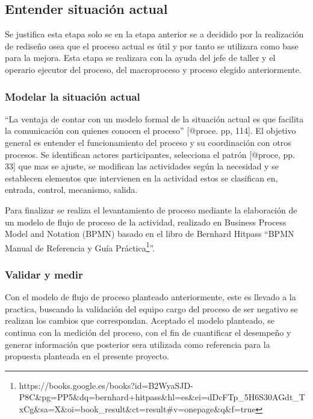 \documentclass[11pt]{article}
\begin{document}
\hypertarget{entender-situaciuxf3n-actual}{%
\subsection{Entender situación
actual}\label{entender-situaciuxf3n-actual}}

Se justifica esta etapa solo se en la etapa anterior se a decidido por
la realización de rediseño osea que el proceso actual es útil y por
tanto se utilizara como base para la mejora. Esta etapa se realizara con
la ayuda del jefe de taller y el operario ejecutor del proceso, del
macroproceso y proceso elegido anteriormente.

\hypertarget{modelar-la-situaciuxf3n-actual}{%
\subsubsection{Modelar la situación
actual}\label{modelar-la-situaciuxf3n-actual}}

``La ventaja de contar con un modelo formal de la situación actual es
que facilita la comunicación con quienes conocen el proceso'' {[}@proce.
pp, 114{]}. El objetivo general es entender el funcionamiento del
proceso y su coordinación con otros procesos. Se identifican actores
participantes, selecciona el patrón {[}@proce, pp. 33{]} que mas se
ajuste, se modifican las actividades según la necesidad y se establecen
elementos que intervienen en la actividad estos se clasifican en,
entrada, control, mecanismo, salida.

Para finalizar se realiza el levantamiento de proceso mediante la
elaboración de un modelo de flujo de proceso de la actividad, realizado
en Business Process Model and Notation (BPMN) basado en el libro de
Bernhard Hitpass ``BPMN Manual de Referencia y Guía Práctica\footnote{https://books.google.es/books?id=B2WyaSJD-P8C\&pg=PP5\&dq=bernhard+hitpass\&hl=es\&ei=dDcFTp\_5H6S30AGdt\_TxCg\&sa=X\&oi=book\_result\&ct=result\#v=onepage\&q\&f=true}''.

\hypertarget{validar-y-medir}{%
\subsubsection{Validar y medir}\label{validar-y-medir}}

Con el modelo de flujo de proceso planteado anteriormente, este es
llevado a la practica, buscando la validación del equipo cargo del
proceso de ser negativo se realizan los cambios que correspondan.
Aceptado el modelo planteado, se continua con la medición del proceso,
con el fin de cuantificar el desempeño y generar información que
posterior sera utilizada como referencia para la propuesta planteada en
el presente proyecto.
\end{document}
